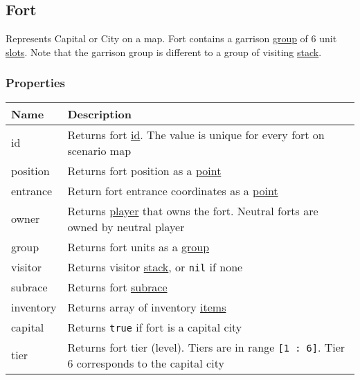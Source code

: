 \subsection{Fort}
\label{Fort}
Represents Capital or City on a map. Fort contains a garrison \hyperref[Group]{group} of 6 unit \hyperref[UnitSlot]{slots}. Note that the garrison group is different to a group of visiting \hyperref[Stack]{stack}.
\subsubsection{Properties}
\begin{center}
\begin{tabularx}{\linewidth}{| l | X |}
\hline
\textbf{Name} & \textbf{Description} \\
\hline
id & Returns fort \hyperref[Id]{id}. The value is unique for every fort on scenario map\\
\hline
position & Returns fort position as a \hyperref[Point]{point}\\
\hline
entrance & Return fort entrance coordinates as a \hyperref[Point]{point}\\
\hline
owner & Returns \hyperref[Player]{player} that owns the fort. Neutral forts are owned by neutral player\\
\hline
group & Returns fort units as a \hyperref[Group]{group}\\
\hline
visitor & Returns visitor \hyperref[Stack]{stack}, or \texttt{nil} if none\\
\hline
subrace & Returns fort \hyperref[SubraceCategory]{subrace}\\
\hline
inventory & Returns array of inventory \hyperref[Item]{items}\\
\hline
capital & Returns \texttt{true} if fort is a capital city\\
\hline
tier & Returns fort tier (level). Tiers are in range \texttt{[1 : 6]}. Tier 6 corresponds to the capital city\\
\hline
\end{tabularx}
\end{center}